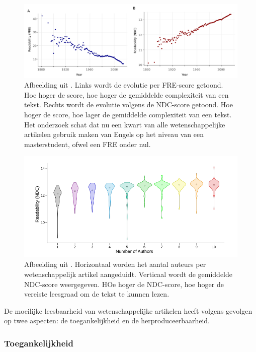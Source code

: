 \begin{figure}[H]
	\includegraphics[width=\linewidth]{img/fre-ndc.png}
	\caption{Afbeelding uit \textcite{PlavenSigray2017}. Links wordt de evolutie per FRE-score getoond. Hoe hoger de score, hoe hoger de gemiddelde complexiteit van een tekst. Rechts wordt de evolutie volgens de NDC-score getoond. Hoe hoger de score, hoe lager de gemiddelde complexiteit van een tekst. Het onderzoek schat dat nu een kwart van alle wetenschappelijke artikelen gebruik maken van Engels op het niveau van een masterstudent, ofwel een FRE onder nul.}
\end{figure}

\begin{figure}[H]
	\includegraphics[width=\linewidth]{img/ndc-number-of-authors.png}
	\caption{Afbeelding uit \textcite{PlavenSigray2017}. Horizontaal worden het aantal auteurs per wetenschappelijk artikel aangeduidt. Verticaal wordt de gemiddelde NDC-score weergegeven. HOe hoger de NDC-score, hoe hoger de vereiste leesgraad om de tekst te kunnen lezen.}
\end{figure}

De moeilijke leesbaarheid van wetenschappelijke artikelen heeft volgens \textcite{PlavenSigray2017} gevolgen op twee aspecten: de toegankelijkheid en de herproduceerbaarheid.

\subsubsection{Toegankelijkheid}

